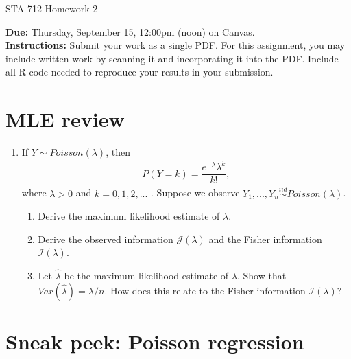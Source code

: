 \documentclass[11pt]{article}
\begin{document}
\begin{center}
\Large
STA 712 Homework 2\\
\normalsize
\vspace{5mm}
\end{center}

\noindent \textbf{Due:} Thursday, September 15, 12:00pm (noon) on Canvas.\\ 

\noindent \textbf{Instructions:} Submit your work as a single PDF. For this assignment, you may include written work by scanning it and incorporating it into the PDF. Include all R code needed to reproduce your results in your submission.

\section*{MLE review}

\begin{enumerate}
\item If $Y \sim Poisson(\lambda)$, then
\begin{align*}
P(Y = k) = \dfrac{e^{-\lambda} \lambda^k}{k!},
\end{align*}
where $\lambda > 0$ and $k = 0, 1, 2, ...$ . Suppose we observe $Y_1,...,Y_n \overset{iid}{\sim} Poisson(\lambda)$.

\begin{enumerate}
\item Derive the maximum likelihood estimate of $\lambda$.
\item Derive the observed information $\mathcal{J}(\lambda)$ and the Fisher information $\mathcal{I}(\lambda)$.
\item Let $\widehat{\lambda}$ be the maximum likelihood estimate of $\lambda$. Show that $Var(\widehat{\lambda}) = \lambda / n$. How does this relate to the Fisher information $\mathcal{I}(\lambda)$?
\end{enumerate}
\end{enumerate}

\section*{Sneak peek: Poisson regression}
\end{document}
